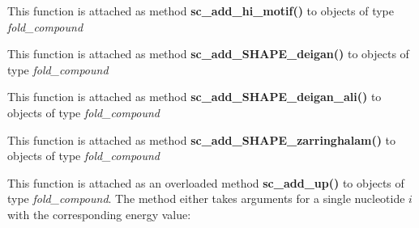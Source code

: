\begin{DoxyRefList}
\item[\label{wrappers__wrappers000008}%
\Hypertarget{wrappers__wrappers000008}%
Global \mbox{\hyperlink{group__constraints__ligand_gaa6ff0113a3a76dc0b8d62961f4e1dfa0}{vrna\+\_\+sc\+\_\+add\+\_\+hi\+\_\+motif}} (vrna\+\_\+fold\+\_\+compound\+\_\+t $\ast$vc, const char $\ast$seq, const char $\ast$structure, F\+L\+T\+\_\+\+O\+R\+\_\+\+D\+BL energy, unsigned int options)]This function is attached as method {\bfseries sc\+\_\+add\+\_\+hi\+\_\+motif()} to objects of type {\itshape fold\+\_\+compound}  
\item[\label{wrappers__wrappers000009}%
\Hypertarget{wrappers__wrappers000009}%
Global \mbox{\hyperlink{group__SHAPE__reactivities_ga57d612b58e1c61dd6cfcb5a843f8f1b3}{vrna\+\_\+sc\+\_\+add\+\_\+\+S\+H\+A\+P\+E\+\_\+deigan}} (vrna\+\_\+fold\+\_\+compound\+\_\+t $\ast$vc, const double $\ast$reactivities, double m, double b, unsigned int options)]This function is attached as method {\bfseries sc\+\_\+add\+\_\+\+S\+H\+A\+P\+E\+\_\+deigan()} to objects of type {\itshape fold\+\_\+compound}  
\item[\label{wrappers__wrappers000010}%
\Hypertarget{wrappers__wrappers000010}%
Global \mbox{\hyperlink{group__SHAPE__reactivities_ga04ba85da63d8c793bb8001d1e6f800ba}{vrna\+\_\+sc\+\_\+add\+\_\+\+S\+H\+A\+P\+E\+\_\+deigan\+\_\+ali}} (vrna\+\_\+fold\+\_\+compound\+\_\+t $\ast$vc, const char $\ast$$\ast$shape\+\_\+files, const int $\ast$shape\+\_\+file\+\_\+association, double m, double b, unsigned int options)]This function is attached as method {\bfseries sc\+\_\+add\+\_\+\+S\+H\+A\+P\+E\+\_\+deigan\+\_\+ali()} to objects of type {\itshape fold\+\_\+compound}  
\item[\label{wrappers__wrappers000011}%
\Hypertarget{wrappers__wrappers000011}%
Global \mbox{\hyperlink{group__SHAPE__reactivities_gaf3c65a045060aef5c4e41693d30af58c}{vrna\+\_\+sc\+\_\+add\+\_\+\+S\+H\+A\+P\+E\+\_\+zarringhalam}} (vrna\+\_\+fold\+\_\+compound\+\_\+t $\ast$vc, const double $\ast$reactivities, double b, double default\+\_\+value, const char $\ast$shape\+\_\+conversion, unsigned int options)]This function is attached as method {\bfseries sc\+\_\+add\+\_\+\+S\+H\+A\+P\+E\+\_\+zarringhalam()} to objects of type {\itshape fold\+\_\+compound}  
\item[\label{wrappers__wrappers000017}%
\Hypertarget{wrappers__wrappers000017}%
Global \mbox{\hyperlink{group__soft__constraints_ga069915fe203a2c8e522dd37847177a09}{vrna\+\_\+sc\+\_\+add\+\_\+up}} (vrna\+\_\+fold\+\_\+compound\+\_\+t $\ast$vc, int i, F\+L\+T\+\_\+\+O\+R\+\_\+\+D\+BL energy, unsigned int options)]This function is attached as an overloaded method {\bfseries sc\+\_\+add\+\_\+up()} to objects of type {\itshape fold\+\_\+compound}. The method either takes arguments for a single nucleotide $i $ with the corresponding energy value\+: 
$$
\end{DoxyRefList}
